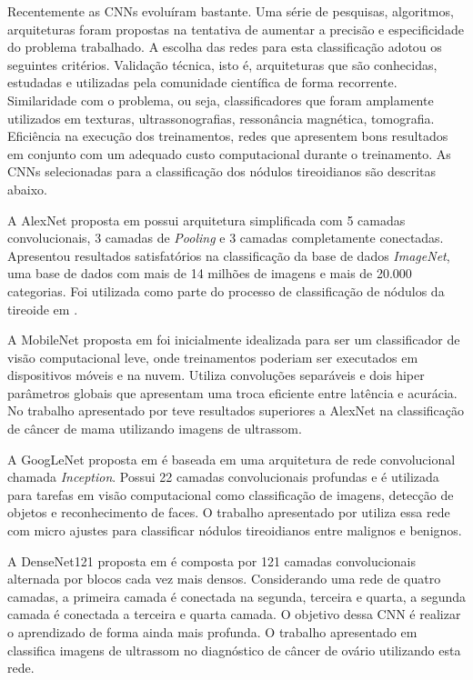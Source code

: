 \documentclass[12pt]{article}
\begin{document}
Recentemente as CNNs evoluíram bastante. Uma série de pesquisas, algoritmos, arquiteturas foram propostas na tentativa de aumentar a precisão e especificidade do problema trabalhado. A escolha das redes para esta classificação adotou os seguintes critérios. Validação técnica, isto é, arquiteturas que são conhecidas, estudadas e utilizadas pela comunidade científica de forma recorrente. Similaridade com o problema, ou seja, classificadores que foram amplamente utilizados em texturas, ultrassonografias, ressonância magnética, tomografia. Eficiência na execução dos treinamentos, redes que apresentem bons resultados em conjunto com um adequado custo computacional durante o treinamento. As CNNs selecionadas para a classificação dos nódulos tireoidianos são descritas abaixo.

A AlexNet proposta em \cite{KrizhevskyA} possui arquitetura simplificada com 5 camadas convolucionais, 3 camadas de \textit{Pooling} e 3 camadas completamente conectadas. Apresentou resultados satisfatórios na classificação da base de dados \textit{ImageNet}, uma base de dados com mais de 14 milhões de imagens e mais de 20.000 categorias. Foi utilizada como parte do processo de classificação de nódulos da tireoide em \cite{ParkV}.

A MobileNet proposta em \cite{AHoward} foi inicialmente idealizada para ser um classificador de visão computacional leve, onde treinamentos poderiam ser executados em dispositivos móveis e na nuvem. Utiliza convoluções separáveis e dois hiper parâmetros globais que apresentam uma troca eficiente entre latência e acurácia. No trabalho apresentado por \cite{SaxenaA} teve resultados superiores a AlexNet na classificação de câncer de mama utilizando imagens de ultrassom.

A GoogLeNet proposta em \cite{ChristianS} é baseada em uma arquitetura de rede convolucional chamada \textit{Inception}. Possui 22 camadas convolucionais profundas e é utilizada para tarefas em visão computacional como classificação de imagens, detecção de objetos e reconhecimento de faces. O trabalho apresentado por \cite{ChiJ} utiliza essa rede com micro ajustes para classificar nódulos tireoidianos entre malignos e benignos.

A DenseNet121 proposta em \cite{GaoH} é composta por 121 camadas convolucionais alternada por blocos cada vez mais densos. Considerando uma rede de quatro camadas, a primeira camada é conectada na segunda, terceira e quarta, a segunda camada é conectada a terceira e quarta camada. O objetivo dessa CNN é realizar o aprendizado de forma ainda mais profunda. O trabalho apresentado em \cite{YueG} classifica imagens de ultrassom no diagnóstico de câncer de ovário utilizando esta rede.
\end{document}
